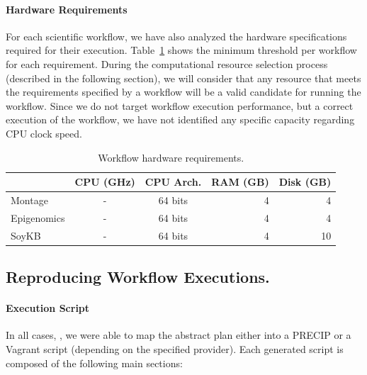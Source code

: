 \paragraph{\textbf{Hardware Requirements}}
For each scientific workflow, we have also analyzed the hardware specifications
required for their execution. Table~\ref{tab:hwreqs} shows the minimum threshold 
per workflow for each requirement. During the computational resource selection 
process (described in the following section), we will consider that any resource that
meets the requirements specified by a workflow will be a valid candidate for running 
the workflow. Since we do not target workflow execution performance, but a correct 
execution of the workflow, we have not identified any specific capacity regarding CPU
clock speed.

\begin{table}[!htb]
	\centering
	\footnotesize
	\setlength{\tabcolsep}{7pt}
	\begin{tabular}{l | c c r r}
 					& CPU (GHz) 	& CPU Arch. 	& RAM (GB)	& Disk (GB) \\ \hline
		Montage 		& -		 	& 64 bits 		& 4 			& 4 \\
		Epigenomics 	& - 			& 64 bits 		& 4 			& 4  \\
		SoyKB 		& -  			& 64 bits 		& 4 			& 10  \\
	\end{tabular}
	\caption{Workflow hardware requirements.}
	\label{tab:hwreqs}
\end{table}


\subsection{Reproducing Workflow Executions.}

\paragraph{\textbf{Execution Script}}

In all cases, ,
we were able to map the abstract plan either into a PRECIP or 
a Vagrant script (depending on the specified provider). Each generated script 
is composed of the following main sections:

